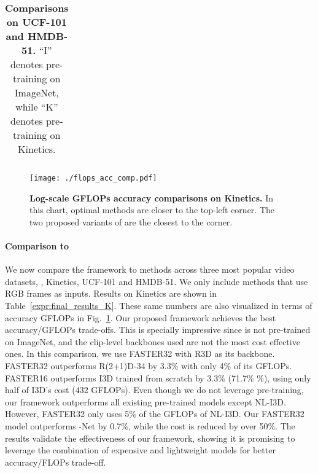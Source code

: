 \documentclass[10pt,twocolumn,letterpaper]{article}
\begin{document}
{{\begin{table}[t]
\begin{center}
{\begin{tabular}{l|cc|c|c}
\end{tabular}}
\end{center}
    \caption{{\bf Comparisons on UCF-101 and HMDB-51.} ``I'' denotes pre-training on ImageNet, while ``K'' denotes pre-training on Kinetics.}
\label{expr:ucf_101}
\end{table}
\begin{figure}[t]
\centering
\texttt{[image: ./flops\_acc\_comp.pdf]}
    \caption{{\bf Log-scale GFLOPs  \vs accuracy  comparisons  on Kinetics.} In this chart, optimal methods are closer to the top-left corner. The two proposed variants of \oursfr are the closest to the corner.
    }
\label{fig:final_cmp}
\end{figure}

\paragraph{Comparison to \sota}
We now compare the \oursfr framework to \sota methods across three most popular video  datasets, \ie, Kinetics, UCF-101 and HMDB-51. We only include methods that use RGB frames as inputs. Results on Kinetics are shown in Table~\ref{expr:final_results_K}. These same numbers are also visualized in terms of accuracy \vs GFLOPs in Fig.~\ref{fig:final_cmp}. Our proposed \oursfr framework achieves the best accuracy/GFLOPs trade-offs.  This is specially impressive since  \oursfr is not pre-trained on ImageNet, and the clip-level backbones used are not the most cost effective ones. In this comparison, we use FASTER32 with R3D as its backbone. FASTER32 outperforms R(2+1)D-34 by 3.3\% with only 4\% of its GFLOPs. FASTER16 outperforms I3D trained from scratch by 3.3\% (71.7\% \%), using only half of I3D's cost (432 GFLOPs).  Even though we do not leverage pre-training, our framework outperforms all existing pre-trained models except NL-I3D. However, FASTER32 only uses 5\% of the GFLOPs of NL-I3D. Our FASTER32 model outperforms -Net by 0.7\%, while the cost is reduced by over 50\%. The results validate the effectiveness of our \oursfr framework, showing it is promising to leverage the combination of expensive and lightweight models for better accuracy/FLOPs trade-off.


}}
\end{document}

